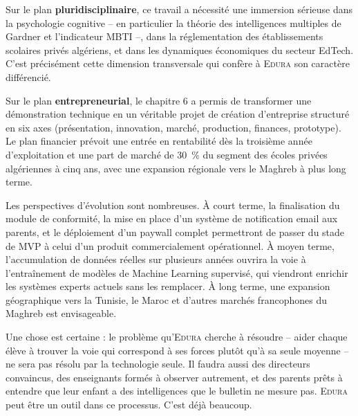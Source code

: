 \documentclass[12pt,a4paper,oneside]{report}
\newcommand{\edura}{\textsc{Edura}}
\begin{document}
\vspace{6pt}
Sur le plan \textbf{pluridisciplinaire}, ce travail a nécessité une immersion sérieuse dans la psychologie cognitive -- en particulier la théorie des intelligences multiples de Gardner et l'indicateur MBTI --, dans la réglementation des établissements scolaires privés algériens, et dans les dynamiques économiques du secteur EdTech. C'est précisément cette dimension transversale qui confère à \edura{} son caractère différencié.

\vspace{6pt}
Sur le plan \textbf{entrepreneurial}, le chapitre 6 a permis de transformer une démonstration technique en un véritable projet de création d'entreprise structuré en six axes (présentation, innovation, marché, production, finances, prototype). Le plan financier prévoit une entrée en rentabilité dès la troisième année d'exploitation et une part de marché de 30~\% du segment des écoles privées algériennes à cinq ans, avec une expansion régionale vers le Maghreb à plus long terme.

\vspace{6pt}
Les perspectives d'évolution sont nombreuses. À court terme, la finalisation du module de conformité, la mise en place d'un système de notification email aux parents, et le déploiement d'un paywall complet permettront de passer du stade de MVP à celui d'un produit commercialement opérationnel. À moyen terme, l'accumulation de données réelles sur plusieurs années ouvrira la voie à l'entraînement de modèles de Machine Learning supervisé, qui viendront enrichir les systèmes experts actuels sans les remplacer. À long terme, une expansion géographique vers la Tunisie, le Maroc et d'autres marchés francophones du Maghreb est envisageable.

\vspace{6pt}
Une chose est certaine : le problème qu'\edura{} cherche à résoudre -- aider chaque élève à trouver la voie qui correspond à ses forces plutôt qu'à sa seule moyenne -- ne sera pas résolu par la technologie seule. Il faudra aussi des directeurs convaincus, des enseignants formés à observer autrement, et des parents prêts à entendre que leur enfant a des intelligences que le bulletin ne mesure pas. \edura{} peut être un outil dans ce processus. C'est déjà beaucoup.

\printbibliography[heading=bibintoc, title={Bibliographie}]
\end{document}

